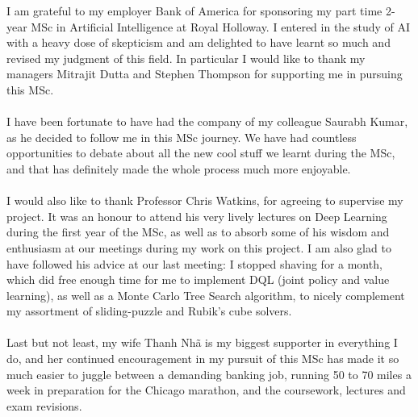 I am grateful to my employer Bank of America for sponsoring my part time 2-year MSc in Artificial Intelligence at Royal Holloway. I entered in the study of AI with a heavy dose of skepticism and am delighted to have learnt so much and revised my judgment of this field.
In particular I would like to thank my managers Mitrajit Dutta and Stephen Thompson for supporting me in pursuing this MSc.
\\
\\
I have been fortunate to have had the company of my colleague Saurabh Kumar, as he decided to follow me in this MSc journey. We have had countless opportunities to debate about all the new cool stuff we learnt during the MSc, and that has definitely made the whole process much more enjoyable.
\\
\\
I would also like to thank Professor Chris Watkins, for agreeing to supervise my project. It was an honour to attend his very lively lectures on Deep Learning during the first year of the MSc, as well as to absorb some of his wisdom and enthusiasm at our meetings during my work on this project. I am also glad to have followed his advice at our last meeting: I stopped shaving for a month, which did free enough time for me to implement DQL (joint policy and value learning), as well as a Monte Carlo Tree Search algorithm, to nicely complement my assortment of sliding-puzzle and Rubik's cube solvers.
\\
\\
Last but not least, my wife Thanh Nh\~a is my biggest supporter in everything I do, and her continued encouragement in my pursuit of this MSc has made it so much easier to juggle between a demanding banking job, running 50 to 70 miles a week in preparation for the Chicago marathon, and the coursework, lectures and exam revisions.